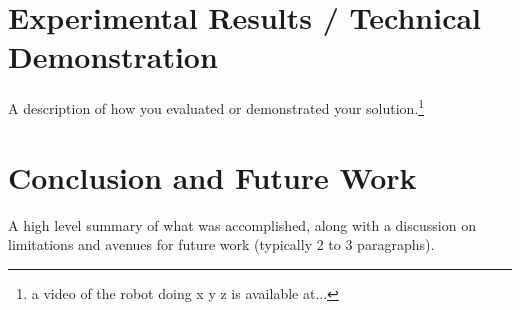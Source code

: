 \documentclass{article}
\begin{document}
\section{Experimental Results / Technical Demonstration}

A description of how you evaluated or demonstrated your solution.\footnote{a video of the robot doing x y z is available at...} 


\section{Conclusion and Future Work}

A high level summary of what was accomplished, along with a discussion on limitations and avenues for future work (typically 2 to 3 paragraphs). 






\end{document}
